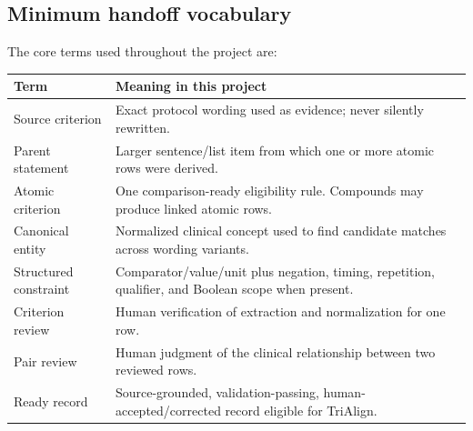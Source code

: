 \documentclass[10pt]{article}
\begin{document}
\subsection{Minimum handoff vocabulary}
The core terms used throughout the project are:
\begin{longtable}{p{.24\linewidth}p{.68\linewidth}}\toprule
Term & Meaning in this project\\\midrule
Source criterion & Exact protocol wording used as evidence; never silently rewritten.\\
Parent statement & Larger sentence/list item from which one or more atomic rows were derived.\\
Atomic criterion & One comparison-ready eligibility rule. Compounds may produce linked atomic rows.\\
Canonical entity & Normalized clinical concept used to find candidate matches across wording variants.\\
Structured constraint & Comparator/value/unit plus negation, timing, repetition, qualifier, and Boolean scope when present.\\
Criterion review & Human verification of extraction and normalization for one row.\\
Pair review & Human judgment of the clinical relationship between two reviewed rows.\\
Ready record & Source-grounded, validation-passing, human-accepted/corrected record eligible for TriAlign.\\\bottomrule
\end{longtable}
\end{document}
